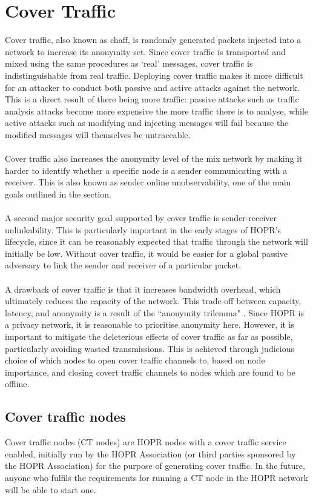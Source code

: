 \section{Cover Traffic}

Cover traffic, also known as chaff, is randomly generated packets injected into a network to increase its anonymity set. Since cover traffic is transported and mixed using the same procedures as `real' messages, cover traffic is indistinguishable from real traffic. Deploying cover traffic makes it more difficult for an attacker to conduct both passive and active attacks against the network. This is a direct result of there being more traffic: passive attacks such as traffic analysis attacks become more expensive the more traffic there is to analyse, while active attacks such as modifying and injecting messages will fail because the modified messages will themselves be untraceable.
\\~\\Cover traffic also increases the anonymity level of the mix network by making it harder to identify whether a specific node is a sender communicating with a receiver. This is also known as sender online unobservability, one of the main goals outlined in the  section.
\\~\\A second major security goal supported by cover traffic is sender-receiver unlinkability. This is particularly important in the early stages of HOPR's lifecycle, since it can be reasonably expected that traffic through the network will initially be low. Without cover traffic, it would be easier for a global passive adversary to link the sender and receiver of a particular packet.
\\~\\A drawback of cover traffic is that it increases bandwidth overhead, which ultimately reduces the capacity of the network. This trade-off between capacity, latency, and anonymity is a result of the ``anonymity trilemma" \cite{AnonymityTrilemma}. Since HOPR is a privacy network, it is reasonable to prioritise anonymity here. However, it is important to mitigate the deleterious effects of cover traffic as far as possible, particularly avoiding wasted transmissions. This is achieved through judicious choice of which nodes to open cover traffic channels to, based on node importance, and closing covert traffic channels to nodes which are found to be offline. 

\subsection{Cover traffic nodes}
Cover traffic nodes (CT nodes) are HOPR nodes with a cover traffic service enabled, initially run by the HOPR Association (or third parties sponsored by the HOPR Association) for the purpose of generating cover traffic. In the future, anyone who fulfils the requirements for running a CT node in the HOPR network will be able to start one.

